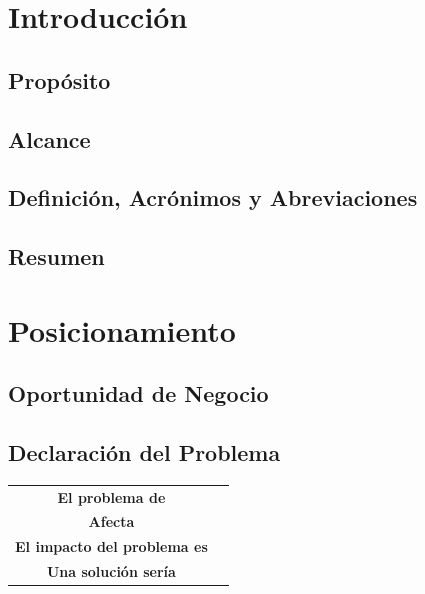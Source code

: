 \documentclass[11pt]{article}
\begin{document}
\newpage
\thispagestyle{empty}
\tableofcontents
\newpage

\section{Introducción}
\subsection{Propósito}

\subsection{Alcance}

\subsection{Definición, Acrónimos y Abreviaciones}

\subsection{Resumen}

\newpage
\section{Posicionamiento}
\subsection{Oportunidad de Negocio}

\subsection{Declaración del Problema}
\begin{table}[H]
	\centering
	\begin{tabular*}{0.75\textwidth}{c | c}
		\hline
		\textbf{El problema de} & \\ \textbf{Afecta} & \\ \textbf{El impacto del problema es} & \\ \textbf{Una solución sería} & \\
		\hline
	\end{tabular*}
\end{table}
\end{document}
